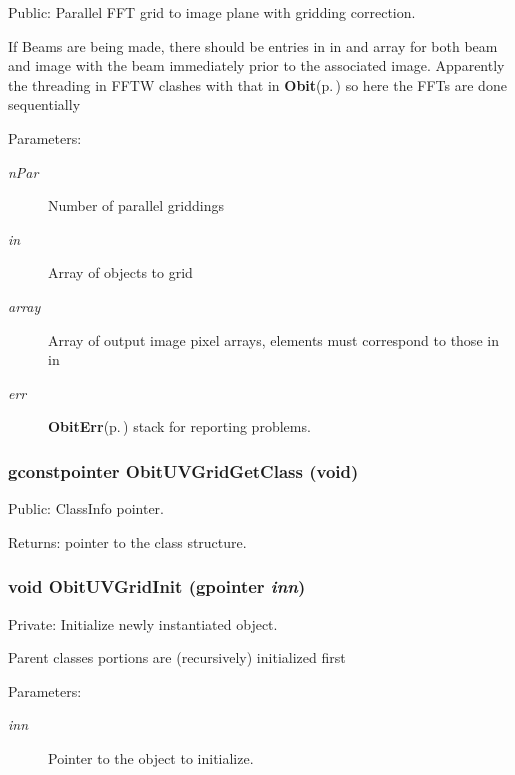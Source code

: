 Public: Parallel FFT grid to image plane with gridding correction. 

If Beams are being made, there should be entries in in and array for both beam and image with the beam immediately prior to the associated image. Apparently the threading in FFTW clashes with that in {\bf Obit}{\rm (p.\,\pageref{structObit})} so here the FFTs are done sequentially \begin{Desc}
\item[Parameters:]
\begin{description}
\item[{\em n\-Par}]Number of parallel griddings \item[{\em in}]Array of objects to grid \item[{\em array}]Array of output image pixel arrays, elements must correspond to those in in \item[{\em err}]{\bf Obit\-Err}{\rm (p.\,\pageref{structObitErr})} stack for reporting problems. \end{description}
\end{Desc}
\subsubsection{\setlength{\rightskip}{0pt plus 5cm}gconstpointer Obit\-UVGrid\-Get\-Class (void)}\label{ObitUVGrid_8c_a17}


Public: Class\-Info pointer. 

\begin{Desc}
\item[Returns:]pointer to the class structure. \end{Desc}
\subsubsection{\setlength{\rightskip}{0pt plus 5cm}void Obit\-UVGrid\-Init (gpointer {\em inn})}\label{ObitUVGrid_8c_a5}


Private: Initialize newly instantiated object. 

Parent classes portions are (recursively) initialized first \begin{Desc}
\item[Parameters:]
\begin{description}
\item[{\em inn}]Pointer to the object to initialize. \end{description}
\end{Desc}
